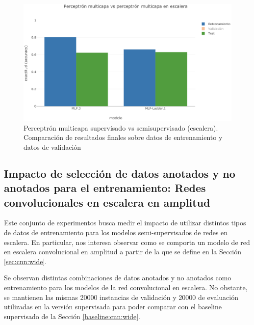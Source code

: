 \begin{figure}[t]
\begin{center}
\includegraphics[width=.9\linewidth]{images/MLP_supervised_ladder_bar.png}
\caption{Perceptrón multicapa supervisado vs semisupervisado (escalera). Comparación de resultados finales
sobre datos de entrenamiento y datos de validación}
\label{fig:MLP_supervised_ladder_bar}
\end{center}
\end{figure}

\subsection{Impacto de selección de datos anotados y no anotados para el entrenamiento: Redes convolucionales 
en escalera en amplitud}

Este conjunto de experimentos busca medir el impacto de utilizar distintos tipos de datos de entrenamiento
para los modelos semi-supervisados de redes en escalera. En particular, nos interesa observar como se comporta
un modelo de red en escalera convolucional en amplitud a partir de la que se define en la Sección 
\ref{sec:cnn:wide}. 

Se observan distintas combinaciones de datos anotados y no anotados como entrenamiento para los modelos de la 
red convolucional en escalera. No obstante, se mantienen las mismas 20000 instancias de validación y 20000 de 
evaluación utilizadas en la versión supervisada para poder comparar con el baseline supervisado de la Sección 
\ref{baseline:cnn:wide}.

